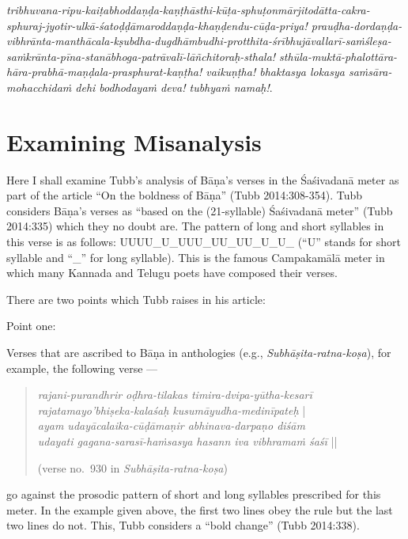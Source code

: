 \begin{enumerate}
{\textsl{tribhuvana-ripu-kaiṭabhoddaṇḍa-kaṇṭhāsthi-kūṭa-sphuṭo\-nmārjitodātta-cakra-sphuraj-jyotir-\break ulkā-śatoḍḍāmaroddaṇḍa-khaṇḍendu-cūḍa-priya! prauḍha-dordaṇḍa-vibhrānta-manthācala-kṣubdha-dugdhāmbudhi-protthita-śrībhujāvallarī-saṁśleṣa-saṁkrānta-pīna-stanābhoga-\break patrāvalī-lāñchitoraḥ-sthala! sthūla-muktā-phalottāra-hāra-prabhā-maṇḍala-prasphurat-\break kaṇṭha! vaikuṇṭha! bhaktasya lokasya saṁsāra-mohacchidaṁ dehi bodhodayaṁ deva! tubhyaṁ namaḥ!}}.
\end{enumerate}

\section*{Examining Misanalysis}

Here I shall examine Tubb’s analysis of Bāṇa’s verses in the Śaśivadanā meter as part of the article “On the boldness of Bāṇa” (Tubb 2014:308-354). Tubb considers Bāṇa’s verses as “based on the (21-syllable) Śaśivadanā meter” (Tubb 2014:335) which they no doubt are. The pattern of long and short syllables in this verse is as follows: UUUU\_U\_UUU\_UU\_UU\_U\_U\_ (“U” stands for short syllable and “\_” for long syllable). This is the famous Campakamālā meter in which many Kannada and Telugu poets have composed their verses.

There are two points which Tubb raises in his article:

Point one: 

Verses that are ascribed to Bāṇa in anthologies (e.g., \textsl{Subhāṣita-ratna-koṣa}), for example, the following verse --- 
\begin{quote}
\textsl{rajani-purandhrir oḍhra-tilakas timira-dvipa-yūtha-kesarī}\\
\qquad \textsl{     rajatamayo’bhiṣeka-kalaśaḥ kusumāyudha-medinīpateḥ} |\\
\textsl{ayam udayācalaika-cūḍāmaṇir abhinava-darpaṇo diśām}\\
\qquad\textsl{udayati gagana-sarasī-haṁsasya hasann iva vibhramaṁ śaśī} ||

\hfill (verse no.\ 930 in \textsl{Subhāṣita-ratna-koṣa}) 
\end{quote}
go against the prosodic pattern of short and long syllables prescribed for this meter. In the example given above, the first two lines obey the rule but the last two lines do not. This, Tubb considers a “bold change” (Tubb 2014:338). 

